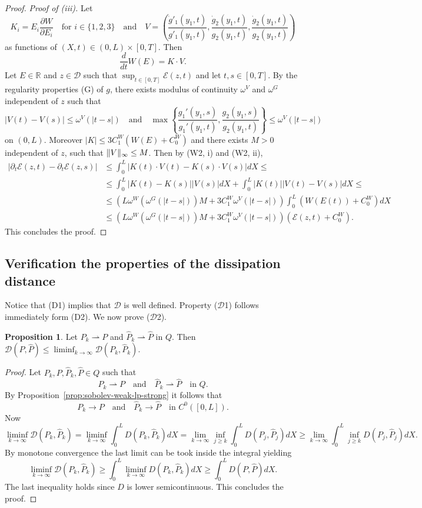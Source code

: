\documentclass[a4paper,10pt,twoside]{amsbook}
\numberwithin{section}{chapter}
\numberwithin{equation}{chapter}
\theoremstyle{definition}
\newtheorem{prop}{Proposition}[chapter]
\DeclarePairedDelimiter{\norm}{\lVert}{\rVert}
\newcommand{\dind}[2]{\frac{\partial #1}{\partial #2}}
\begin{document}
\begin{proof}
\emph{Proof of (iii).} Let
\[
K_i=E_i\dind{W}{E_i}\quad\text{for $i\in\{1,2,3\}$}\quad\text{and}\quad V=\left(\frac{\dot{g}'_1(y_1,t)}{g'_1(y_1,t)},\frac{\dot{g}_2(y_1,t)}{g_2(y_1,t)},\frac{\dot{g}_2(y_1,t)}{g_2(y_1,t)}\right)
\]
as functions of $(X,t)\in(0,L)\times[0,T]$. Then
\[
\frac{d}{dt}W(E)=K\cdot V.
\]
Let $E\in\mathbb{R}$ and $z\in\mathscr{D}$ such that $\sup_{t\in[0,T]}\mathcal{E}(z,t)$ and let $t,s\in[0,T]$. By the regularity properties (G) of $g$, there exists modulus of continuity $\omega^V$ and $\omega^G$ independent of $z$ such that
\[
|V(t)-V(s)|\le\omega^V(|t-s|)\quad\text{and}\quad\max\left\{\frac{g_1'(y_1,s)}{g_1'(y_1,t)},\frac{g_2(y_1,s)}{g_2(y_1,t)}\right\}\le\omega^V(|t-s|)
\]
on $(0,L)$. Moreover $|K|\le 3C_1^W(W(E)+C_0^W)$ and there exists $M>0$ independent of $z$, such that $\norm{V}_\infty\le M$. Then by (W2, i) and (W2, ii),
\[
\begin{split}
|\partial_t\mathcal{E}(z,t)-\partial_t\mathcal{E}(z,s)|&\le\int_0^L|K(t)\cdot V(t)-K(s)\cdot V(s)|dX\le\\
&\le\int_0^L|K(t)-K(s)||V(s)|dX+\int_0^L|K(t)||V(t)-V(s)|dX\le\\
&\le \left(L\omega^W(\omega^G(|t-s|))M+3C_1^W\omega^V(|t-s|)\right)\int_0^L(W(E(t))+C_0^W)dX\\
&\le\left(L\omega^W(\omega^G(|t-s|))M+3C_1^W\omega^V(|t-s|)\right)(\mathcal{E}(z,t)+C_0^W).
\end{split}
\]
This concludes the proof.
\end{proof}

\subsection{Verification the properties of the dissipation distance}

Notice that (D1) implies that $\mathcal{D}$ is well defined. Property ($\mathcal{D}$1) follows immediately form (D2). We now prove ($\mathcal{D}$2).
\begin{prop}
Let $P_k\rightharpoonup P$ and $\hat{P}_k\rightharpoonup\hat{P}$ in $Q$. Then $\mathcal{D}(P,\hat{P})\le\liminf_{k\to\infty}\mathcal{D}(P_k,\hat{P}_k)$.
\end{prop}
\begin{proof}
Let $P_k,P,\hat{P}_k,\hat{P}\in Q$ such that
\[
P_k\rightharpoonup P\quad\text{and}\quad\hat{P}_k\rightharpoonup\hat{P}\quad\text{in $Q$.}
\]
By Proposition~\ref{prop:sobolev-weak-lp-strong} it follows that
\[
P_k\to P\quad\text{and}\quad\hat{P}_k\to\hat{P}\quad\text{in $C^0([0,L])$.}
\]
Now
\[
\liminf_{k\to\infty}\mathcal{D}(P_k,\hat{P}_k)=\liminf_{k\to\infty}\int_0^LD(P_k,\hat{P}_k)dX=\lim_{k\to\infty}\inf_{j\ge k}\int_0^LD(P_j,\hat{P}_j)dX\ge\lim_{k\to\infty}\int_0^L\inf_{j\ge k}D(P_j,\hat{P}_j)dX.
\]
By monotone convergence the last limit can be took inside the integral yielding
\[
\liminf_{k\to\infty}\mathcal{D}(P_k,\hat{P}_k)\ge\int_0^L\liminf_{k\to\infty}D(P_k,\hat{P}_k)dX\ge\int_0^L D(P,\hat{P})dX.
\]
The last inequality holds since $D$ is lower semicontinuous. This concludes the proof.
\end{proof}
\end{document}
